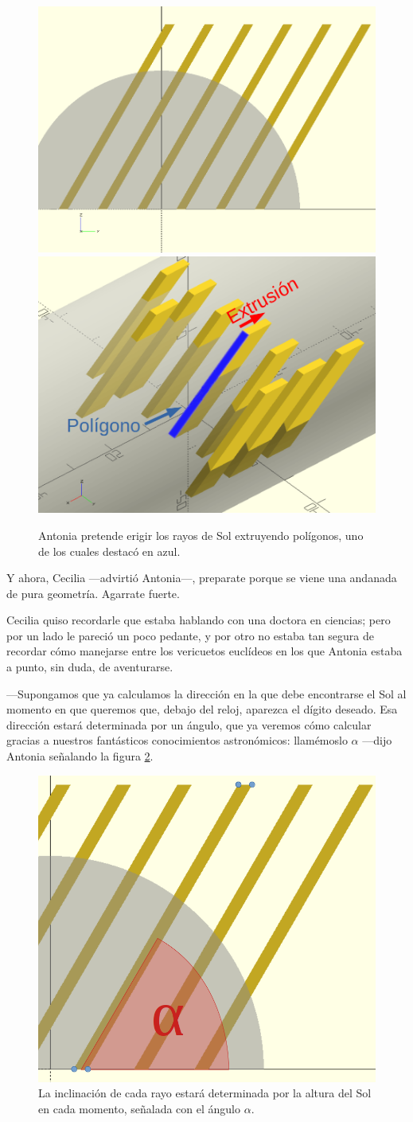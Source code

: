 \begin{figure}[ht]
  \centering
  \includegraphics[width=.49\textwidth]{imagenes/digito-perfil}\hfill
  \includegraphics[width=.49\textwidth]{imagenes/digito-extrudido}
  \caption{Antonia pretende erigir los rayos de Sol extruyendo
    polígonos, uno de los cuales destacó en azul.}
  \label{fig:digito-perfil-extrudido}
\end{figure}

\guillemotright Y ahora, Cecilia ---advirtió Antonia---, preparate
porque se viene una andanada de pura geometría. Agarrate fuerte.

Cecilia quiso recordarle que estaba hablando con una doctora en
ciencias; pero por un lado le pareció un poco pedante, y por otro no
estaba tan segura de recordar cómo manejarse entre los vericuetos
euclídeos en los que Antonia estaba a punto, sin duda, de aventurarse.

---Supongamos que ya calculamos la dirección en la que debe
encontrarse el Sol al momento en que queremos que, debajo del reloj,
aparezca el dígito deseado. Esa dirección estará determinada por un
ángulo, que ya veremos cómo calcular gracias a nuestros fantásticos
conocimientos astronómicos: llamémoslo $\alpha$ ---dijo Antonia
señalando la figura \ref{fig:poligono-alfa}.

\begin{figure}[ht]
  \centering
  \includegraphics[width=.4\textwidth]{imagenes/poligono-pixel}
  \caption{La inclinación de cada rayo estará determinada por la
    altura del Sol en cada momento, señalada con el ángulo $\alpha$.}
  \label{fig:poligono-alfa}
\end{figure}


